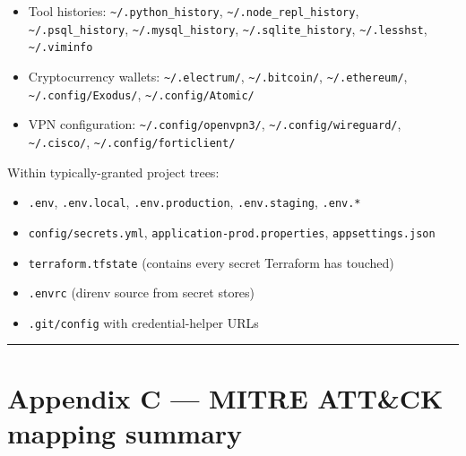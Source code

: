\begin{itemize}
  \texttt{\textasciitilde{}/.zsh\_history},
  \texttt{\textasciitilde{}/.fish\_history},
  \texttt{\textasciitilde{}/.local/share/fish/fish\_history}
\item
  Tool histories: \texttt{\textasciitilde{}/.python\_history},
  \texttt{\textasciitilde{}/.node\_repl\_history},
  \texttt{\textasciitilde{}/.psql\_history},
  \texttt{\textasciitilde{}/.mysql\_history},
  \texttt{\textasciitilde{}/.sqlite\_history},
  \texttt{\textasciitilde{}/.lesshst},
  \texttt{\textasciitilde{}/.viminfo}
\item
  Cryptocurrency wallets: \texttt{\textasciitilde{}/.electrum/},
  \texttt{\textasciitilde{}/.bitcoin/},
  \texttt{\textasciitilde{}/.ethereum/},
  \texttt{\textasciitilde{}/.config/Exodus/},
  \texttt{\textasciitilde{}/.config/Atomic/}
\item
  VPN configuration: \texttt{\textasciitilde{}/.config/openvpn3/},
  \texttt{\textasciitilde{}/.config/wireguard/},
  \texttt{\textasciitilde{}/.cisco/},
  \texttt{\textasciitilde{}/.config/forticlient/}
\end{itemize}

Within typically-granted project trees:

\begin{itemize}
\tightlist
\item
  \texttt{.env}, \texttt{.env.local}, \texttt{.env.production},
  \texttt{.env.staging}, \texttt{.env.*}
\item
  \texttt{config/secrets.yml}, \texttt{application-prod.properties},
  \texttt{appsettings.json}
\item
  \texttt{terraform.tfstate} (contains every secret Terraform has
  touched)
\item
  \texttt{.envrc} (direnv source from secret stores)
\item
  \texttt{.git/config} with credential-helper URLs
\end{itemize}

\begin{center}\rule{0.5\linewidth}{0.5pt}\end{center}

\hypertarget{appendix-c-mitre-attck-mapping-summary}{%
\chapter{Appendix C --- MITRE ATT\&CK mapping
summary}\label{appendix-c-mitre-attck-mapping-summary}}

